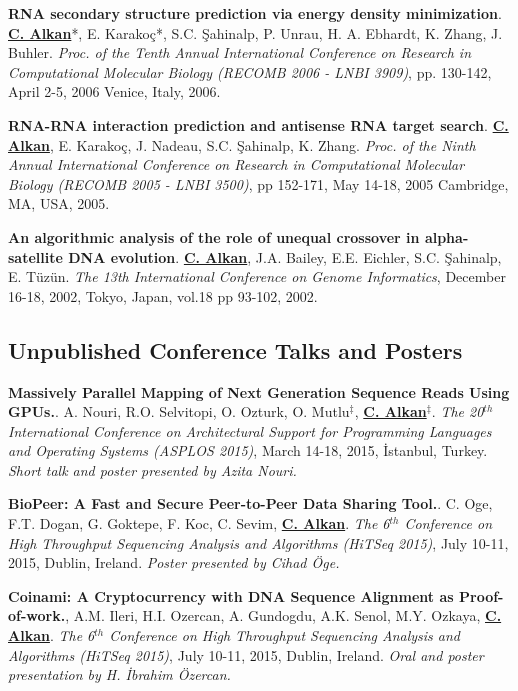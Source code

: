 \vspace{-.2cm}
{\bf RNA secondary structure prediction via energy density minimization}.
{\bf {\underline{C. Alkan}}}*, E. Karako\c{c}*, S.C. \c{S}ahinalp, P. Unrau,
H. A. Ebhardt, K. Zhang, J. Buhler.
{\em Proc. of the Tenth Annual International Conference on Research in Computational Molecular Biology
  (RECOMB 2006 - LNBI 3909)}, pp. 130-142,
  April 2-5, 2006 Venice, Italy, 2006.


\vspace{-.2cm}
 {\bf RNA-RNA interaction prediction and antisense RNA target search}.
  {\bf {\underline{C. Alkan}}}, E. Karako\c{c}, J. Nadeau, S.C. \c{S}ahinalp,
  K. Zhang.
  {\em Proc. of the Ninth Annual International Conference on Research in Computational Molecular Biology
    (RECOMB 2005 - LNBI 3500)}, pp 152-171, 
    May 14-18, 2005 Cambridge, MA, USA, 2005.

\vspace{-.2cm}
 {\bf An algorithmic analysis of the role of unequal crossover in
  alpha-satellite DNA evolution}.
  {\bf {\underline{C. Alkan}}}, J.A. Bailey, E.E. Eichler, S.C. \c{S}ahinalp, E. T\"{u}z\"{u}n.
{\em The 13th International Conference on Genome Informatics}, 
December 16-18, 2002, Tokyo, Japan, vol.18 pp 93-102, 2002.

\vspace{-.4cm}
\subsection{\small \sc  Unpublished Conference Talks and Posters}
\vspace{-.2cm}
 {\bf Massively Parallel Mapping of Next Generation Sequence Reads Using GPUs.}.
  A. Nouri, R.O. Selvitopi, O. Ozturk, O. Mutlu$^\ddag$, {\bf {\underline{C. Alkan}}}$^\ddag$.
{\em The 20$^{th}$ International Conference on Architectural Support for Programming Languages and Operating Systems (ASPLOS 2015)}, 
March 14-18, 2015, İstanbul, Turkey. {\it Short talk and poster presented by Azita Nouri.}

\vspace{-.2cm}
 {\bf BioPeer: A Fast and Secure Peer-to-Peer Data Sharing Tool.}.
  C. Oge, F.T. Dogan, G. Goktepe, F. Koc, C. Sevim, {\bf {\underline{C. Alkan}}}.
{\em The 6$^{th}$ Conference on High Throughput Sequencing Analysis and Algorithms (HiTSeq 2015)}, 
July 10-11, 2015, Dublin, Ireland. {\it Poster presented by Cihad Öge.}

\vspace{-.2cm}
 {\bf Coinami: A Cryptocurrency with DNA Sequence Alignment as Proof-of-work.},
  A.M. Ileri, H.I. Ozercan, A. Gundogdu, A.K. Senol, M.Y. Ozkaya, {\bf {\underline{C. Alkan}}}.
{\em The 6$^{th}$ Conference on High Throughput Sequencing Analysis and Algorithms (HiTSeq 2015)}, 
July 10-11, 2015, Dublin, Ireland. {\it Oral and poster presentation by H. İbrahim Özercan.}

